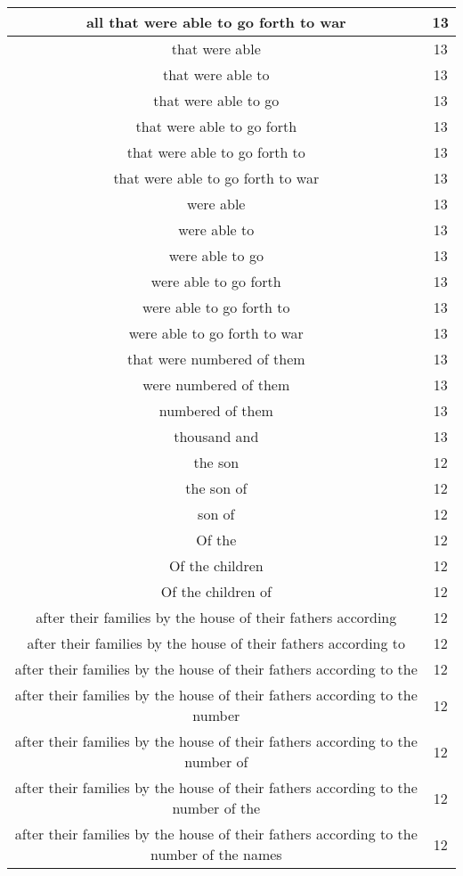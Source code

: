 \begin{center}
\begin{longtable}{|c|c|}
all that were able to go forth to war & 13\\ \hline 
that were able & 13\\ \hline 
that were able to & 13\\ \hline 
that were able to go & 13\\ \hline 
that were able to go forth & 13\\ \hline 
that were able to go forth to & 13\\ \hline 
that were able to go forth to war & 13\\ \hline 
were able & 13\\ \hline 
were able to & 13\\ \hline 
were able to go & 13\\ \hline 
were able to go forth & 13\\ \hline 
were able to go forth to & 13\\ \hline 
were able to go forth to war & 13\\ \hline 
that were numbered of them & 13\\ \hline 
were numbered of them & 13\\ \hline 
numbered of them & 13\\ \hline 
thousand and & 13\\ \hline 
the son & 12\\ \hline 
the son of & 12\\ \hline 
son of & 12\\ \hline 
Of the & 12\\ \hline 
Of the children & 12\\ \hline 
Of the children of & 12\\ \hline 
after their families by the house of their fathers according & 12\\ \hline 
after their families by the house of their fathers according to & 12\\ \hline 
after their families by the house of their fathers according to the & 12\\ \hline 
after their families by the house of their fathers according to the number & 12\\ \hline 
after their families by the house of their fathers according to the number of & 12\\ \hline 
after their families by the house of their fathers according to the number of the & 12\\ \hline 
after their families by the house of their fathers according to the number of the names & 12\\ \hline 

\end{longtable}
\end{center}
